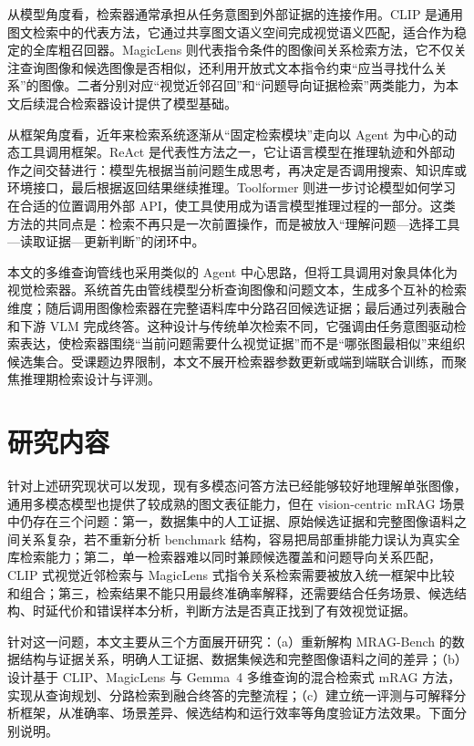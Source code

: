 从模型角度看，检索器通常承担从任务意图到外部证据的连接作用。CLIP 是通用图文检索中的代表方法，它通过共享图文语义空间完成视觉语义匹配，适合作为稳定的全库粗召回器\cite{radford2021clip}。MagicLens 则代表指令条件的图像间关系检索方法，它不仅关注查询图像和候选图像是否相似，还利用开放式文本指令约束“应当寻找什么关系”的图像\cite{zhang2024magiclens}。二者分别对应“视觉近邻召回”和“问题导向证据检索”两类能力，为本文后续混合检索器设计提供了模型基础。

从框架角度看，近年来检索系统逐渐从“固定检索模块”走向以 Agent 为中心的动态工具调用框架。ReAct 是代表性方法之一，它让语言模型在推理轨迹和外部动作之间交替进行：模型先根据当前问题生成思考，再决定是否调用搜索、知识库或环境接口，最后根据返回结果继续推理\cite{yao2023react}。Toolformer 则进一步讨论模型如何学习在合适的位置调用外部 API，使工具使用成为语言模型推理过程的一部分\cite{schick2023toolformer}。这类方法的共同点是：检索不再只是一次前置操作，而是被放入“理解问题—选择工具—读取证据—更新判断”的闭环中。

本文的多维查询管线也采用类似的 Agent 中心思路，但将工具调用对象具体化为视觉检索器。系统首先由管线模型分析查询图像和问题文本，生成多个互补的检索维度；随后调用图像检索器在完整语料库中分路召回候选证据；最后通过列表融合和下游 VLM 完成终答。这种设计与传统单次检索不同，它强调由任务意图驱动检索表达，使检索器围绕“当前问题需要什么视觉证据”而不是“哪张图最相似”来组织候选集合。受课题边界限制，本文不展开检索器参数更新或端到端联合训练，而聚焦推理期检索设计与评测。

\section{研究内容}

针对上述研究现状可以发现，现有多模态问答方法已经能够较好地理解单张图像，通用多模态模型也提供了较成熟的图文表征能力，但在 vision-centric mRAG 场景中仍存在三个问题：第一，数据集中的人工证据、原始候选证据和完整图像语料之间关系复杂，若不重新分析 benchmark 结构，容易把局部重排能力误认为真实全库检索能力；第二，单一检索器难以同时兼顾候选覆盖和问题导向关系匹配，CLIP 式视觉近邻检索与 MagicLens 式指令关系检索需要被放入统一框架中比较和组合；第三，检索结果不能只用最终准确率解释，还需要结合任务场景、候选结构、时延代价和错误样本分析，判断方法是否真正找到了有效视觉证据。

针对这一问题，本文主要从三个方面展开研究：（a）重新解构 MRAG-Bench 的数据结构与证据关系，明确人工证据、数据集候选和完整图像语料之间的差异；（b）设计基于 CLIP、MagicLens 与 Gemma~4 多维查询的混合检索式 mRAG 方法，实现从查询规划、分路检索到融合终答的完整流程；（c）建立统一评测与可解释分析框架，从准确率、场景差异、候选结构和运行效率等角度验证方法效果。下面分别说明。

